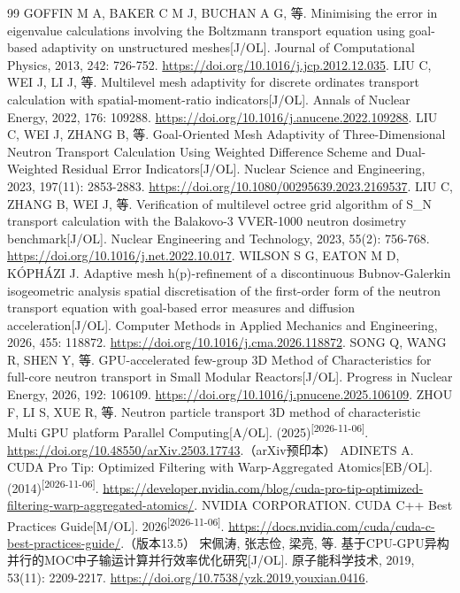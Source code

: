 \documentclass[UTF8, zihao=-4, fontset=none, a4paper]{ctexart}
\newcommand{\upcite}[1]{\textsuperscript{[#1]}}
\begin{document}
\begin{thebibliography}{99}
 GOFFIN M A, BAKER C M J, BUCHAN A G, 等. Minimising the error in eigenvalue calculations involving the Boltzmann transport equation using goal-based adaptivity on unstructured meshes{[}J/OL{]}. Journal of Computational Physics, 2013, 242: 726-752. \url{https://doi.org/10.1016/j.jcp.2012.12.035}.
 LIU C, WEI J, LI J, 等. Multilevel mesh adaptivity for discrete ordinates transport calculation with spatial-moment-ratio indicators{[}J/OL{]}. Annals of Nuclear Energy, 2022, 176: 109288. \url{https://doi.org/10.1016/j.anucene.2022.109288}.
 LIU C, WEI J, ZHANG B, 等. Goal-Oriented Mesh Adaptivity of Three-Dimensional Neutron Transport Calculation Using Weighted Difference Scheme and Dual-Weighted Residual Error Indicators{[}J/OL{]}. Nuclear Science and Engineering, 2023, 197(11): 2853-2883. \url{https://doi.org/10.1080/00295639.2023.2169537}.
 LIU C, ZHANG B, WEI J, 等. Verification of multilevel octree grid algorithm of S\_N transport calculation with the Balakovo-3 VVER-1000 neutron dosimetry benchmark{[}J/OL{]}. Nuclear Engineering and Technology, 2023, 55(2): 756-768. \url{https://doi.org/10.1016/j.net.2022.10.017}.
 WILSON S G, EATON M D, KÓPHÁZI J. Adaptive mesh h(p)-refinement of a discontinuous Bubnov-Galerkin isogeometric analysis spatial discretisation of the first-order form of the neutron transport equation with goal-based error measures and diffusion acceleration{[}J/OL{]}. Computer Methods in Applied Mechanics and Engineering, 2026, 455: 118872. \url{https://doi.org/10.1016/j.cma.2026.118872}.
 SONG Q, WANG R, SHEN Y, 等. GPU-accelerated few-group 3D Method of Characteristics for full-core neutron transport in Small Modular Reactors{[}J/OL{]}. Progress in Nuclear Energy, 2026, 192: 106109. \url{https://doi.org/10.1016/j.pnucene.2025.106109}.
 ZHOU F, LI S, XUE R, 等. Neutron particle transport 3D method of characteristic Multi GPU platform Parallel Computing{[}A/OL{]}. (2025)\upcite{2026-11-06}. \url{https://doi.org/10.48550/arXiv.2503.17743}.（arXiv预印本）
 ADINETS A. CUDA Pro Tip: Optimized Filtering with Warp-Aggregated Atomics{[}EB/OL{]}. (2014)\upcite{2026-11-06}. \url{https://developer.nvidia.com/blog/cuda-pro-tip-optimized-filtering-warp-aggregated-atomics/}.
 NVIDIA CORPORATION. CUDA C++ Best Practices Guide{[}M/OL{]}. 2026\upcite{2026-11-06}. \url{https://docs.nvidia.com/cuda/cuda-c-best-practices-guide/}.（版本13.5）
 宋佩涛, 张志俭, 梁亮, 等. 基于CPU-GPU异构并行的MOC中子输运计算并行效率优化研究{[}J/OL{]}. 原子能科学技术, 2019, 53(11): 2209-2217. \url{https://doi.org/10.7538/yzk.2019.youxian.0416}.

\end{thebibliography}
\end{document}
